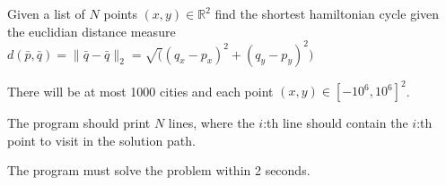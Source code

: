 Given a list of $N$ points $(x,y) \in \mathbb{R}^2$ 
find the shortest hamiltonian cycle given the 
euclidian distance measure~\cite{wikipedia:euclidean_distance} 
$d(\bar{p},\bar{q})=\|\bar{q}-\bar{q}\|_2=
\sqrt((q_x-p_x)^2+(q_y-p_y)^2)$

There will be at most 1000 cities and each point $(x, y) \in \left[-10^6,10^6\right]^2$.

The program should print $N$ lines, where the $i$:th line should contain 
the $i$:th point to visit in the solution path.

The program must solve the problem within 2 seconds.
